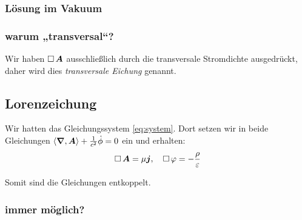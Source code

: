 \fehlt

\subsubsection{Lösung im Vakuum}

\subsubsection{warum „transversal“?}

Wir haben $\mathop{{}\Box}\nolimits \boldsymbol{A}$ ausschließlich durch die transversale Stromdichte
ausgedrückt, daher wird dies \emph{transversale Eichung} genannt.

\subsection{Lorenzeichung}

Wir hatten das Gleichungssystem \eqref{eq:system}. Dort setzen wir in beide
Gleichungen $\left\langle \boldsymbol{\nabla}, \boldsymbol{A} \right\rangle + \frac{1}{c^2} \dot \phi = 0$ ein und
erhalten:
\[
	\mathop{{}\Box}\nolimits \boldsymbol{A} = \mu \boldsymbol{j}
	,\quad
	\mathop{{}\Box}\nolimits \varphi = - \frac \rho \varepsilon
\]

Somit sind die Gleichungen entkoppelt.

\subsubsection{immer möglich?}

\fehlt

%
%




